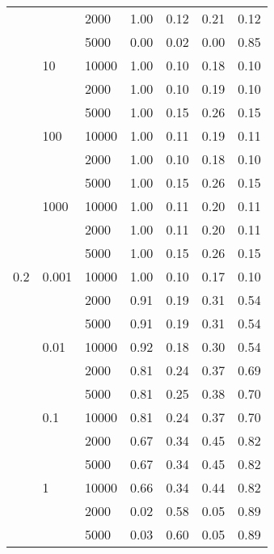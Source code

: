 \begin{tabular}{lllrrrr}
      &       & 2000 &       1.00 &       0.12 &       0.21 &       0.12 \\
      &       & 5000 &       0.00 &       0.02 &       0.00 &       0.85 \\
      & 10 & 10000 &       1.00 &       0.10 &       0.18 &       0.10 \\
      &       & 2000 &       1.00 &       0.10 &       0.19 &       0.10 \\
      &       & 5000 &       1.00 &       0.15 &       0.26 &       0.15 \\
      & 100 & 10000 &       1.00 &       0.11 &       0.19 &       0.11 \\
      &       & 2000 &       1.00 &       0.10 &       0.18 &       0.10 \\
      &       & 5000 &       1.00 &       0.15 &       0.26 &       0.15 \\
      & 1000 & 10000 &       1.00 &       0.11 &       0.20 &       0.11 \\
      &       & 2000 &       1.00 &       0.11 &       0.20 &       0.11 \\
      &       & 5000 &       1.00 &       0.15 &       0.26 &       0.15 \\
0.2 & 0.001 & 10000 &       1.00 &       0.10 &       0.17 &       0.10 \\
      &       & 2000 &       0.91 &       0.19 &       0.31 &       0.54 \\
      &       & 5000 &       0.91 &       0.19 &       0.31 &       0.54 \\
      & 0.01 & 10000 &       0.92 &       0.18 &       0.30 &       0.54 \\
      &       & 2000 &       0.81 &       0.24 &       0.37 &       0.69 \\
      &       & 5000 &       0.81 &       0.25 &       0.38 &       0.70 \\
      & 0.1 & 10000 &       0.81 &       0.24 &       0.37 &       0.70 \\
      &       & 2000 &       0.67 &       0.34 &       0.45 &       0.82 \\
      &       & 5000 &       0.67 &       0.34 &       0.45 &       0.82 \\
      & 1 & 10000 &       0.66 &       0.34 &       0.44 &       0.82 \\
      &       & 2000 &       0.02 &       0.58 &       0.05 &       0.89 \\
      &       & 5000 &       0.03 &       0.60 &       0.05 &       0.89 \\

\end{tabular}
